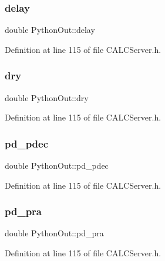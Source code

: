 \subsubsection{\texorpdfstring{delay}{delay}}
{\footnotesize\ttfamily double Python\+Out\+::delay}



Definition at line 115 of file C\+A\+L\+C\+Server.\+h.

\mbox{\label{struct_python_out_a16d779a59480222faecb242797935998}} 
\subsubsection{\texorpdfstring{dry}{dry}}
{\footnotesize\ttfamily double Python\+Out\+::dry}



Definition at line 115 of file C\+A\+L\+C\+Server.\+h.

\mbox{\label{struct_python_out_ac85c9eafa7be8e3c5008c044ae5903ed}} 
\subsubsection{\texorpdfstring{pd\+\_\+pdec}{pd\_pdec}}
{\footnotesize\ttfamily double Python\+Out\+::pd\+\_\+pdec}



Definition at line 115 of file C\+A\+L\+C\+Server.\+h.

\mbox{\label{struct_python_out_a695e03fc5653156952d1357e768d1ce6}} 
\subsubsection{\texorpdfstring{pd\+\_\+pra}{pd\_pra}}
{\footnotesize\ttfamily double Python\+Out\+::pd\+\_\+pra}



Definition at line 115 of file C\+A\+L\+C\+Server.\+h.

\mbox{\label{struct_python_out_a30aebb8233212f3fdd75b1d2e7d39c41}} 
